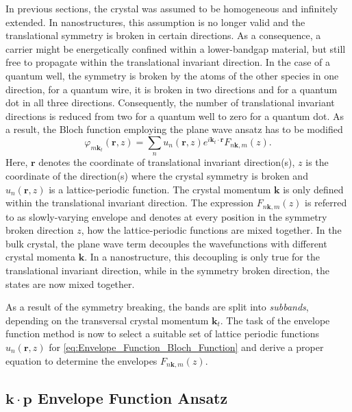 In previous sections, the crystal was assumed to be homogeneous and
infinitely extended. In nanostructures, this assumption is no longer
valid and the translational symmetry is broken in certain directions.
As a consequence, a carrier might be energetically confined within
a lower-bandgap material, but still free to propagate within the translational
invariant direction. In the case of a quantum well, the symmetry is
broken by the atoms of the other species in one direction, for a quantum
wire, it is broken in two directions and for a quantum dot in all
three directions. Consequently, the number of translational invariant
directions is reduced from two for a quantum well to zero for a quantum
dot. As a result, the Bloch function employing the plane wave ansatz
has to be modified\begin{equation}
\varphi_{m\mathbf{k}_{t}}(\mathbf{r},z)=\sum_{n}u_{n}(\mathbf{r},z)e^{i\mathbf{k}_{t}\cdot\mathbf{r}}F_{n\mathbf{k},m}(z).\label{eq:Envelope_Function_Bloch_Function}\end{equation}
Here, $\mathbf{r}$ denotes the coordinate of translational invariant
direction(s), $z$ is the coordinate of the direction(s) where the
crystal symmetry is broken and $u_{n}(\mathbf{r},z)$ is a lattice-periodic
function. The crystal momentum \textbf{$\mathbf{k}$} is only defined
within the translational invariant direction. The expression $F_{n\mathbf{k},m}(z)$
is referred to as slowly-varying envelope and denotes at every position
in the symmetry broken direction $z$, how the lattice-periodic functions
are mixed together. In the bulk crystal, the plane wave term decouples
the wavefunctions with different crystal momenta $\mathbf{k}$. In
a nanostructure, this decoupling is only true for the translational
invariant direction, while in the symmetry broken direction, the states
are now mixed together. 

As a result of the symmetry breaking, the bands are split into \emph{subbands},
depending on the transversal crystal momentum $\mathbf{k}_{t}$. The
task of the envelope function method is now to select a suitable set
of lattice periodic functions $u_{n}(\mathbf{r},z)$ for \ref{eq:Envelope_Function_Bloch_Function}
and derive a proper equation to determine the envelopes $F_{n\mathbf{k},m}(z)$.


\subsection{$\mathbf{k}\cdot\mathbf{p}$ Envelope Function Ansatz}

